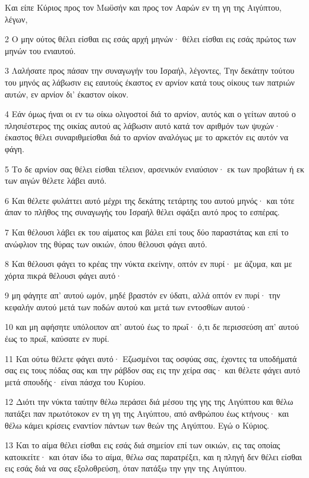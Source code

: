\par Και είπε Κύριος προς τον Μωϋσήν και προς τον Ααρών εν τη γη της Αιγύπτου, λέγων,
\par 2 Ο μην ούτος θέλει είσθαι εις εσάς αρχή μηνών· θέλει είσθαι εις εσάς πρώτος των μηνών του ενιαυτού.
\par 3 Λαλήσατε προς πάσαν την συναγωγήν του Ισραήλ, λέγοντες, Την δεκάτην τούτου του μηνός ας λάβωσιν εις εαυτούς έκαστος εν αρνίον κατά τους οίκους των πατριών αυτών, εν αρνίον δι' έκαστον οίκον.
\par 4 Εάν όμως ήναι οι εν τω οίκω ολιγοστοί διά το αρνίον, αυτός και ο γείτων αυτού ο πλησιέστερος της οικίας αυτού ας λάβωσιν αυτό κατά τον αριθμόν των ψυχών· έκαστος θέλει συναριθμείσθαι διά το αρνίον αναλόγως με το αρκετόν εις αυτόν να φάγη.
\par 5 Το δε αρνίον σας θέλει είσθαι τέλειον, αρσενικόν ενιαύσιον· εκ των προβάτων ή εκ των αιγών θέλετε λάβει αυτό.
\par 6 Και θέλετε φυλάττει αυτό μέχρι της δεκάτης τετάρτης του αυτού μηνός· και τότε άπαν το πλήθος της συναγωγής του Ισραήλ θέλει σφάξει αυτό προς το εσπέρας.
\par 7 Και θέλουσι λάβει εκ του αίματος και βάλει επί τους δύο παραστάτας και επί το ανώφλιον της θύρας των οικιών, όπου θέλουσι φάγει αυτό.
\par 8 Και θέλουσι φάγει το κρέας την νύκτα εκείνην, οπτόν εν πυρί· με άζυμα, και με χόρτα πικρά θέλουσι φάγει αυτό·
\par 9 μη φάγητε απ' αυτού ωμόν, μηδέ βραστόν εν ύδατι, αλλά οπτόν εν πυρί· την κεφαλήν αυτού μετά των ποδών αυτού και μετά των εντοσθίων αυτού·
\par 10 και μη αφήσητε υπόλοιπον απ' αυτού έως το πρωΐ· ό,τι δε περισσεύση απ' αυτού έως το πρωΐ, καύσατε εν πυρί.
\par 11 Και ούτω θέλετε φάγει αυτό· Εζωσμένοι τας οσφύας σας, έχοντες τα υποδήματά σας εις τους πόδας σας και την ράβδον σας εις την χείρα σας· και θέλετε φάγει αυτό μετά σπουδής· είναι πάσχα του Κυρίου.
\par 12 Διότι την νύκτα ταύτην θέλω περάσει διά μέσου της γης της Αιγύπτου και θέλω πατάξει παν πρωτότοκον εν τη γη της Αιγύπτου, από ανθρώπου έως κτήνους· και θέλω κάμει κρίσεις εναντίον πάντων των θεών της Αιγύπτου. Εγώ ο Κύριος.
\par 13 Και το αίμα θέλει είσθαι εις εσάς διά σημείον επί των οικιών, εις τας οποίας κατοικείτε· και όταν ίδω το αίμα, θέλω σας παρατρέξει, και η πληγή δεν θέλει είσθαι εις εσάς διά να σας εξολοθρεύση, όταν πατάξω την γην της Αιγύπτου.

